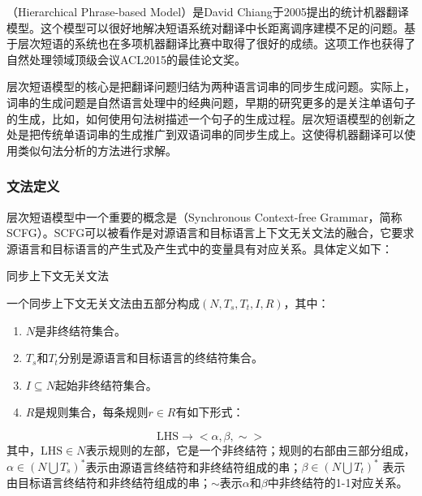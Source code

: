 （Hierarchical Phrase-based Model）是David Chiang于2005提出的统计机器翻译模型\cite{chiang2005a,chiang2007hierarchical}。这个模型可以很好地解决短语系统对翻译中长距离调序建模不足的问题。基于层次短语的系统也在多项机器翻译比赛中取得了很好的成绩。这项工作也获得了自然处理领域顶级会议ACL2015的最佳论文奖。

\parinterval 层次短语模型的核心是把翻译问题归结为两种语言词串的同步生成问题。实际上，词串的生成问题是自然语言处理中的经典问题，早期的研究更多的是关注单语句子的生成，比如，如何使用句法树描述一个句子的生成过程。层次短语模型的创新之处是把传统单语词串的生成推广到双语词串的同步生成上。这使得机器翻译可以使用类似句法分析的方法进行求解。


\subsubsection{文法定义}

\parinterval 层次短语模型中一个重要的概念是{\small{}}（Synchronous Context-free Grammar，简称SCFG）。SCFG可以被看作是对源语言和目标语言上下文无关文法的融合，它要求源语言和目标语言的产生式及产生式中的变量具有对应关系。具体定义如下：

\vspace{0.5em}
\begin{definition} 同步上下文无关文法

{\small
一个同步上下文无关文法由五部分构成$(N, T_s, T_t, I, R)$，其中：
\begin{enumerate}
\item $N$是非终结符集合。
\item $T_s$和$T_t$分别是源语言和目标语言的终结符集合。
\item $I \subseteq N$起始非终结符集合。
\item $R$是规则集合，每条规则$r \in R$有如下形式：
\end{enumerate}
\begin{displaymath}
\textrm{LHS} \to <\alpha, \beta, \sim>
\end{displaymath}
其中，$\textrm{LHS} \in N$表示规则的左部，它是一个非终结符；规则的右部由三部分组成，$\alpha \in (N \bigcup T_s)^{*}$表示由源语言终结符和非终结符组成的串；$\beta \in (N \bigcup T_t)^{*}$ 表示由目标语言终结符和非终结符组成的串；$\sim$表示$\alpha$和$\beta$中非终结符的1-1对应关系。
}
\end{definition}

